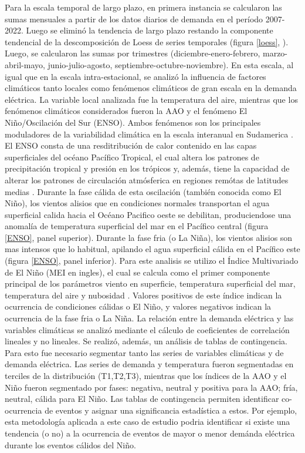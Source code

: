 \documentclass[11pt,a4paper]{article}
\begin{document}
Para la escala temporal de largo plazo, en primera instancia se calcularon las sumas mensuales a partir de los datos diarios de demanda en el período 2007-2022. Luego se eliminó la tendencia de largo plazo restando la componente tendencial de la descomposición de Loess de series temporales (figura \ref{loess}, \cite{cleveland1990stl}). Luego, se calcularon las sumas por trimestres (diciembre-enero-febrero, marzo-abril-mayo, junio-julio-agosto, septiembre-octubre-noviembre). En esta escala, al igual que en la escala intra-estacional, se analizó la influencia de factores climáticos tanto locales como fenómenos climáticos de gran escala en la demanda eléctrica. La variable local analizada fue la temperatura del aire, mientras que los fenómenos climáticos considerados fueron la AAO y el fenómeno El Niño/Oscilación del Sur (ENSO). Ambos fenómenos son los principales moduladores de la variabilidad climática en la escala interanual en Sudamerica \cite{grimm2000climate,cai2020climate,garreaud2009present, silvestri2009nonstationary}. El ENSO consta de una resditribución de calor contenido en las capas superficiales del océano Pacífico Tropical, el cual altera los patrones de precipitación tropical y presión en los trópicos y, además, tiene la capacidad de alterar los patrones de circulación atmósferica en regiones remótas de latitudes medias \cite{diaz2000nino,cai2020climate}. Durante la fase cálida de esta oscilación (también conocida como El Niño), los vientos alisios que en condiciones normales transportan el agua superficial calida hacia el Océano Pacifico oeste se debilitan, produciendose una anomalía de temperatura superficial del mar en el Pacífico central (figura \ref{ENSO}, panel superior). Durante la fase fria (o La Niña), los vientos alisios son mas intensos que lo habitual, apilando el agua superficial cálida en el Pacífico este (figura \ref{ENSO}, panel inferior). Para este analisis se utilizo el Índice Multivariado de El Niño (MEI en ingles), el cual se calcula como el primer componente principal de los parámetros viento en superficie, temperatura superficial del mar, temperatura del aire y nubosidad \cite{wolter2011nino}. Valores positivos de este índice indican la ocurrencia de condiciones cálidas o El Niño, y valores negativos indican la ocurrencia de la fase fria o La Niña.  
La relación entre la demanda eléctrica y las variables climáticas se analizó mediante el cálculo de coeficientes de correlación lineales y no lineales. Se realizó, además, un análisis de  tablas de contingencia. Para esto fue necesario segmentar tanto las series de variables climáticas y de demanda eléctrica. Las series de demanda y temperatura fueron segmentadas en terciles de la distribución (T1,T2,T3), mientras que los índices de la AAO y el Niño fueron segmentado por fases: negativa, neutral y positiva para la AAO; fría, neutral, cálida para El Niño. Las tablas de contingencia permiten identificar co-ocurrencia de eventos y asignar una significancia estadística a estos. Por ejemplo, esta metodología aplicada a este caso de estudio podria identificar si existe una tendencia (o no) a la ocurrencia de eventos de mayor o menor demánda eléctrica durante los eventos cálidos del Niño.  
\end{document}
